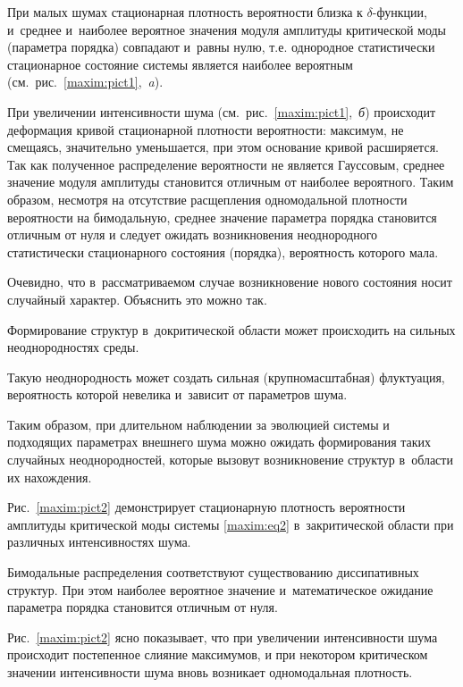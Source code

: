 При малых шумах стационарная плотность вероятности близка к $\delta$-функции, и~среднее и~наиболее вероятное значения модуля амплитуды критической моды (параметра порядка) совпадают и~равны нулю, т.е. однородное статистически стационарное состояние системы является наиболее вероятным (см.~рис.~\ref{maxim:pict1},~{\sl a}\/). 

При увеличении интенсивности шума (см.~рис.~\ref{maxim:pict1},~{\sl б}\/) происходит деформация кривой стационарной плотности вероятности: максимум, не смещаясь, значительно уменьшается, при этом основание кривой расширяется. Так как полученное распределение вероятности не является Гауссовым, среднее значение модуля амплитуды становится отличным от наиболее вероятного. Таким образом, несмотря на отсутствие расщепления одномодальной плотности вероятности на бимодальную, среднее значение параметра порядка становится отличным от нуля и следует ожидать возникновения неоднородного статистически стационарного состояния (порядка), вероятность которого мала. 



Очевидно, что в~рассматриваемом случае возникновение нового состояния носит случайный характер. Объяснить это можно так. 

Формирование структур в~докритической области может происходить на сильных неоднородностях среды. 

Такую неоднородность может создать сильная (крупномасштабная) флуктуация, вероятность которой невелика и~зависит от параметров шума. 

Таким образом, при длительном наблюдении за эволюцией системы и подходящих параметрах внешнего шума можно ожидать формирования таких случайных неоднородностей, которые вызовут возникновение структур в~области их нахождения.



Рис.~\ref{maxim:pict2} демонстрирует стационарную плотность вероятности амплитуды критической моды системы \eqref{maxim:eq2} в~закритической области при различных интенсивностях шума. 

Бимодальные распределения соответствуют существованию диссипативных структур. При этом наиболее вероятное значение и~математическое ожидание параметра порядка становится отличным от нуля. 

Рис.~\ref{maxim:pict2} ясно показывает, что при увеличении интенсивности шума происходит постепенное слияние максимумов, и при некотором критическом значении интенсивности шума вновь возникает одномодальная плотность. 

